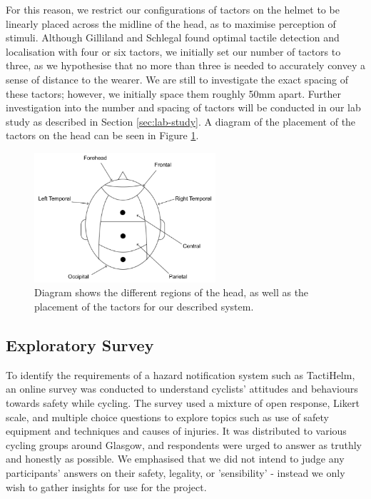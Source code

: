 \documentclass{interim}
\begin{document}
For this reason, we restrict our configurations of tactors on the helmet to be linearly placed across the midline of the head, as to maximise perception of stimuli. Although Gilliland and Schlegal \cite{doi:10.1177/001872089403600410} found optimal tactile detection and localisation with four or six tactors, we initially set our number of tactors to three, as we hypothesise that no more than three is needed to accurately convey a sense of distance to the wearer. We are still to investigate the exact spacing of these tactors; however, we initially space them roughly 50mm apart. Further investigation into the number and spacing of tactors will be conducted in our lab study as described in Section \ref{sec:lab-study}. A diagram of the placement of the tactors on the head can be seen in Figure \ref{fig:head-regions}.

\begin{figure}[ht]
    \centering
    \includegraphics[width=0.60\textwidth]{images/head-regions.pdf}
    \caption{Diagram shows the different regions of the head, as well as the placement of the tactors for our described system.}
    \label{fig:head-regions}
\end{figure}


\subsection{Exploratory Survey}\label{sec:survey}
To identify the requirements of a hazard notification system such as TactiHelm, an online survey was conducted to understand cyclists' attitudes and behaviours towards safety while cycling. The survey used a mixture of open response, Likert scale, and multiple choice questions to explore topics such as use of safety equipment and techniques and causes of injuries. It was distributed to various cycling groups around Glasgow, and respondents were urged to answer as truthly and honestly as possible. We emphasised that we did not intend to judge any participants' answers on their safety, legality, or 'sensibility' - instead we only wish to gather insights for use for the project.
\end{document}
